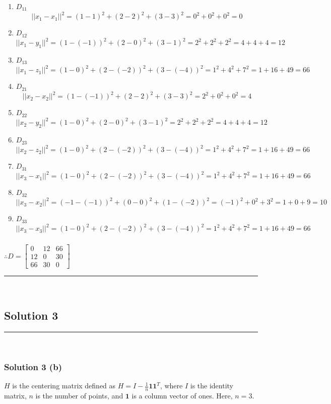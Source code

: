\documentclass{article}
\begin{document}
\begin{enumerate}
    \item $D_{11}$
    $$||x_1 - x_1||^2 = (1 - 1)^2 + (2 - 2)^2 + (3 - 3)^2 = 0^2 + 0^2 + 0^2 = 0 $$
    \item $D_{12}$  
    $$||x_1 - y_1||^2 = (1 - (-1))^2 + (2 - 0)^2 + (3 - 1)^2 = 2^2 + 2^2 + 2^2 = 4+4+4 = 12$$
    \item $D_{13}$  
    $$||x_1 - z_1||^2 = (1 - 0)^2 + (2 - (-2))^2 + (3 - (-4))^2 = 1^2 + 4^2 + 7^2 = 1+16+49 = 66$$
    \item $D_{21}$
    $$||x_2 - x_2||^2 = (1 - (-1))^2 + (2 - 2)^2 + (3 - 3)^2 = 2^2 + 0^2 + 0^2 = 4$$
    \item $D_{22}$
    $$||x_2 - y_2||^2 = (1 - 0)^2 + (2 - 0)^2 + (3 - 1)^2 = 2^2 + 2^2 + 2^2 = 4+4+4 = 12$$
    \item $D_{23}$
    $$||x_2 - z_2||^2 = (1 - 0)^2 + (2 - (-2))^2 + (3 - (-4))^2 = 1^2 + 4^2 + 7^2 = 1+16+49 = 66$$
    \item $D_{31}$
    $$||x_3 - x_1||^2 = (1 - 0)^2 + (2 - (-2))^2 + (3 - (-4))^2 = 1^2 + 4^2 + 7^2 = 1+16+49 = 66$$
    \item $D_{32}$
    $$||x_3 - x_2||^2 = (-1 - (-1))^2 + (0 - 0)^2 + (1 - (-2))^2 = (-1)^2 + 0^2 + 3^2 = 1+0+9 = 10$$
    \item $D_{33}$
    $$||x_3 - x_3||^2 = (1 - 0)^2 + (2 - (-2))^2 + (3 - (-4))^2 = 1^2 + 4^2 + 7^2 = 1+16+49 = 66$$
\end{enumerate}
\subsubsection*{\normalfont}{$\therefore D = \begin{bmatrix} 0 & 12 & 66 \\ 12 & 0 & 30 \\ 66 & 30 & 0 \end{bmatrix}$}

\noindent\rule{\textwidth}{0.4pt}\\

\newpage


\subsection*{Solution 3}
\noindent\rule{\textwidth}{0.4pt}\\
\subsubsection*{Solution 3 (b)}
$H$ is the centering matrix defined as $H = I - \frac{1}{n}\mathbf{1}\mathbf{1}^T$, where $I$ is the identity matrix, $n$ is the number of points, and $\mathbf{1}$ is a column vector of ones.
Here, $n=3$.
\end{document}

